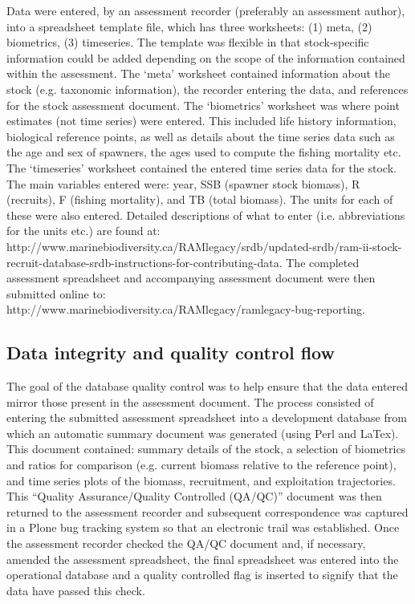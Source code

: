 \documentclass[letterpaper,12pt]{article}
\begin{document}
Data were entered, by an assessment recorder (preferably an assessment
author), into a spreadsheet template file, which has three worksheets:
(1) meta, (2) biometrics, (3) timeseries. The template was flexible in
that stock-specific information could be added depending on the scope of
the information contained within the assessment. The `meta' worksheet
contained information about the stock (e.g. taxonomic information), the
recorder entering the data, and references for the stock assessment
document. The `biometrics' worksheet was where point estimates (not
time series) were entered. This included life history information,
biological reference points, as well as details about the time series
data such as the age and sex of spawners, the ages used to compute the
fishing mortality etc. The `timeseries' worksheet contained the entered time series
data for the stock. The main variables entered were: year, SSB (spawner stock biomass), R (recruits), F
(fishing mortality), and TB (total biomass). The units for each of
these were also entered. Detailed descriptions of what to enter (i.e.
abbreviations for the units etc.) are found at:
http://www.marinebiodiversity.ca/RAMlegacy/srdb/updated-srdb/ram-ii-stock-recruit-database-srdb-instructions-for-contributing-data.
 The completed assessment spreadsheet and accompanying assessment
document were then submitted online to:\\
http://www.marinebiodiversity.ca/RAMlegacy/ramlegacy-bug-reporting.


\subsection{Data integrity and quality control flow}
The goal of the database quality control was to help ensure that the data entered
mirror those present in the assessment document. The process consisted
of entering the submitted assessment spreadsheet into a development
database from which an automatic summary document was generated (using
Perl and LaTex). This document contained: summary details of the stock,
a selection of biometrics and ratios for comparison (e.g. current
biomass relative to the reference point), and time series plots of the
biomass, recruitment, and exploitation trajectories. This ``Quality
Assurance/Quality Controlled (QA/QC)'' document was then returned to
the assessment recorder and subsequent correspondence was captured in a
Plone bug tracking system so that an electronic trail was established.
Once the assessment recorder checked the QA/QC document and, if
necessary, amended the assessment spreadsheet, the final spreadsheet
was entered into the operational database and a quality controlled
flag is inserted to signify that the data have passed this check.
 
\end{document}
